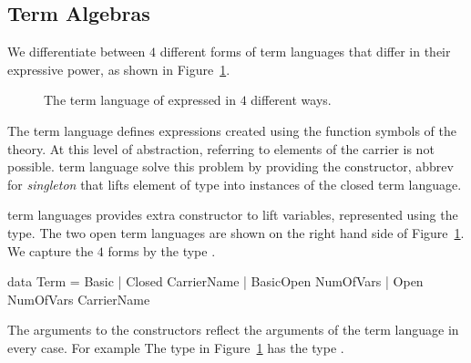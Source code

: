\subsection{Term Algebras}

We differentiate between $4$ different forms of term languages that differ in their expressive power, as shown in Figure~\ref{fig:term-lang-4-forms}. 
\begin{figure}
    
    \caption{The term language of  expressed in $4$ different ways.}
    \label{fig:term-lang-4-forms}
\end{figure}

The  term language defines expressions created using the function symbols of the theory. At this level of abstraction, referring to elements of the carrier is not possible.  term language solve this problem by providing the  constructor, abbrev for \emph{singleton} that lifts element of type  into instances of the closed term language. 

 term languages provides extra constructor to lift variables, represented using the  type. The two open term languages are shown on the right hand side of Figure~\ref{fig:term-lang-4-forms}.  We capture the $4$ forms by the type . 
\begin{hscode}
data Term = Basic
          | Closed CarrierName
          | BasicOpen NumOfVars
          | Open NumOfVars CarrierName
\end{hscode}
The arguments to the constructors reflect the arguments of the term language in every case. For example The type  in Figure~\ref{fig:term-lang-4-forms} has the type . 

